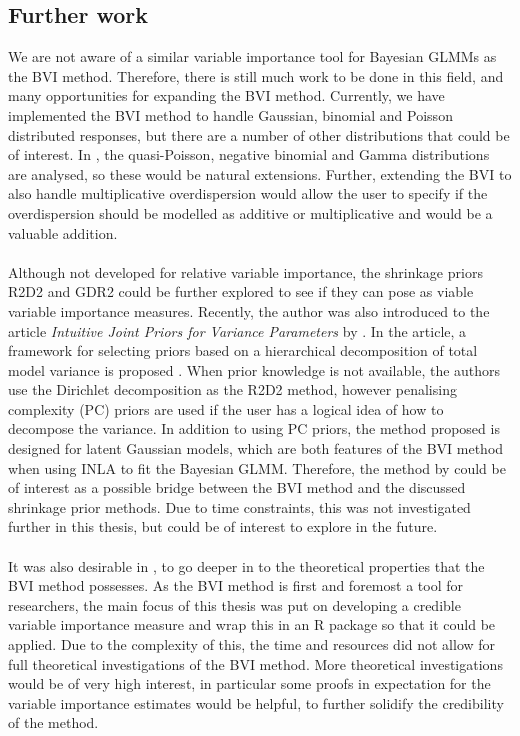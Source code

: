 \subsection*{Further work}
We are not aware of a similar variable importance tool for Bayesian GLMMs as the BVI method. Therefore, there is still much work to be done in this field, and many opportunities for expanding the BVI method. Currently, we have implemented the BVI method to handle Gaussian, binomial and Poisson distributed responses, but there are a number of other distributions that could be of interest. In \citet{nakagawa2017}, the quasi-Poisson, negative binomial and Gamma distributions are analysed, so these would be natural extensions. Further, extending the BVI to also handle multiplicative overdispersion would allow the user to specify if the overdispersion should be modelled as additive or multiplicative and would be a valuable addition.
\\
\\
Although not developed for relative variable importance, the shrinkage priors R2D2 and GDR2 could be further explored to see if they can pose as viable variable importance measures. Recently, the author was also introduced to the article \textit{Intuitive Joint Priors for Variance Parameters} by \citet{Fuglstad2020_joint_priors}. In the article, a framework for selecting priors based on a hierarchical decomposition of total model variance is proposed \citep{Fuglstad2020_joint_priors}. When prior knowledge is not available, the authors use the Dirichlet decomposition as the R2D2 method, however penalising complexity (PC) priors are used if the user has a logical idea of how to decompose the variance. In addition to using PC priors, the method proposed is designed for latent Gaussian models, which are both features of the BVI method when using INLA to fit the Bayesian GLMM. Therefore, the method by \citet{Fuglstad2020_joint_priors} could be of interest as a possible bridge between the BVI method and the discussed shrinkage prior methods. Due to time constraints, this was not investigated further in this thesis, but could be of interest to explore in the future.
\\
\\
It was also desirable in \citet{Arnstad:Relative_variable_importance_in_Bayesian_linear_mixed_models:2024}, to go deeper in to the theoretical properties that the BVI method possesses. As the BVI method is first and foremost a tool for researchers, the main focus of this thesis was put on developing a credible variable importance measure and wrap this in an R package so that it could be applied. Due to the complexity of this, the time and resources did not allow for full theoretical investigations of the BVI method. More theoretical investigations would be of very high interest, in particular some proofs in expectation for the variable importance estimates would be helpful, to further solidify the credibility of the method. 
